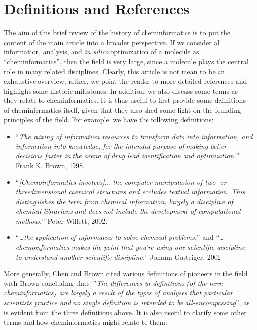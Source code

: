 \documentclass{sig-alternate}
\begin{document}
\section{Definitions and References}
The aim of this brief review of the history of cheminformatics is to
put the content of the main article into a broader perspective. If we
consider all information, analysis, and \emph{in silico} optimization
of a molecule as ``cheminformatics'', then the field is very large,
since a molecule plays the central role in many related
disciplines. Clearly, this article is not mean to be an exhaustive
overview; rather, we point the reader to more detailed references and
highlight some historic milestones.  In addition, we also discuss
some terms as they relate to cheminformatics.  It is thus useful to
first provide some definitions of cheminformatics itself, given that
they also shed some light on the founding principles of the field. For
example, we have the following definitions:
\begin{itemize}
\item ``\textit{The mixing of information resources to transform data
    into information, and information into knowledge, for the intended
    purpose of making better decisions faster in the arena of drug
    lead identification and optimization.}'' Frank K. Brown, 1998.
\item ``\textit{[Chemoinformatics involves]... the computer
    manipulation of two- or threedimensional chemical structures and
    excludes textual information. This distinguishes the term from
    chemical information, largely a discipline of chemical librarians
    and does not include the development of computational methods.}''
  Peter Willett, 2002.
\item ``\textit{\ldots the application of informatics to solve chemical
    problems.}'' and ``\textit{\ldots chemoinformatics makes the point that
    you're using one scientific discipline to understand another
    scientific discipline.}'' Johann Gasteiger, 2002
\end{itemize}
More generally, Chen\cite{Chen2006} and Brown \cite{brown2009} cited various
definitions of pioneers in the field with Brown concluding that  
``'\textit{The differences in definitions (of the term
  cheminformatics) are largely a result of the types of analyses that
  particular scientists practice and no single definition is intended
  to be all-encompassing}'', as is evident from the three definitions above. 
It is also useful to clarify some other terms and how
cheminformatics might relate to them:
\end{document}

